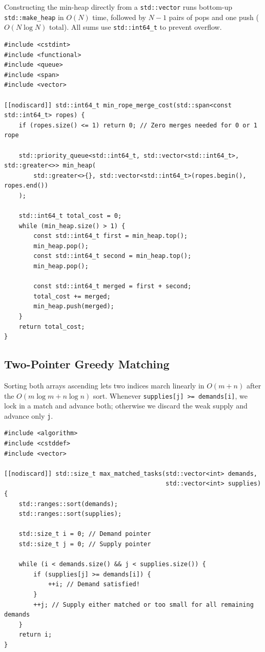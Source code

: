 \documentclass[11pt,a4paper]{article}
\theoremstyle{definition}
\begin{document}
Constructing the min-heap directly from a \texttt{std::vector} runs bottom-up \texttt{std::make\_heap} in $O(N)$ time, followed by $N - 1$ pairs of pops and one push ($O(N \log N)$ total). All sums use \texttt{std::int64\_t} to prevent overflow.

\begin{lstlisting}[caption={Minimum-Cost Rope Merging (Huffman Cost) in $O(N \log N)$ time}]
#include <cstdint>
#include <functional>
#include <queue>
#include <span>
#include <vector>

[[nodiscard]] std::int64_t min_rope_merge_cost(std::span<const std::int64_t> ropes) {
    if (ropes.size() <= 1) return 0; // Zero merges needed for 0 or 1 rope

    std::priority_queue<std::int64_t, std::vector<std::int64_t>, std::greater<>> min_heap(
        std::greater<>{}, std::vector<std::int64_t>(ropes.begin(), ropes.end())
    );

    std::int64_t total_cost = 0;
    while (min_heap.size() > 1) {
        const std::int64_t first = min_heap.top();
        min_heap.pop();
        const std::int64_t second = min_heap.top();
        min_heap.pop();

        const std::int64_t merged = first + second;
        total_cost += merged;
        min_heap.push(merged);
    }
    return total_cost;
}
\end{lstlisting}

\subsection{Two-Pointer Greedy Matching}

Sorting both arrays ascending lets two indices march linearly in $O(m + n)$ after the $O(m \log m + n \log n)$ sort. Whenever \texttt{supplies[j] >= demands[i]}, we lock in a match and advance both; otherwise we discard the weak supply and advance only \texttt{j}.

\begin{lstlisting}[caption={Two-Pointer Greedy Matching in $O(m \log m + n \log n)$ time}]
#include <algorithm>
#include <cstddef>
#include <vector>

[[nodiscard]] std::size_t max_matched_tasks(std::vector<int> demands,
                                            std::vector<int> supplies) {
    std::ranges::sort(demands);
    std::ranges::sort(supplies);

    std::size_t i = 0; // Demand pointer
    std::size_t j = 0; // Supply pointer

    while (i < demands.size() && j < supplies.size()) {
        if (supplies[j] >= demands[i]) {
            ++i; // Demand satisfied!
        }
        ++j; // Supply either matched or too small for all remaining demands
    }
    return i;
}
\end{lstlisting}
\end{document}
